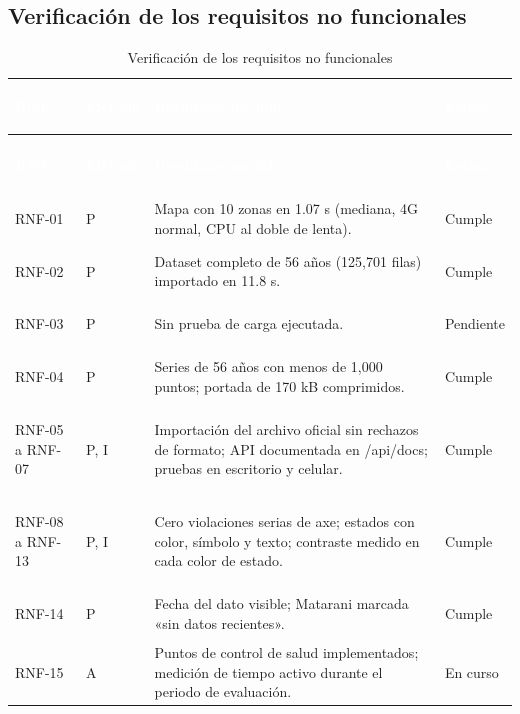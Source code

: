 \documentclass[11pt,a4paper,oneside]{article}
\begin{document}
\subsection{Verificación de los requisitos no funcionales}

{\footnotesize
\begin{xltabular}{\textwidth}{@{}>{\sffamily\bfseries\raggedright\arraybackslash}p{2.4cm}>{\raggedright\arraybackslash}p{1.3cm}Y>{\raggedright\arraybackslash}p{1.8cm}@{}}
\caption{Verificación de los requisitos no funcionales}\label{tab:verrnf}\\
\textcolor{white}{\sffamily\bfseries\footnotesize RNF} & \textcolor{white}{\sffamily\bfseries\footnotesize Método} & \textcolor{white}{\sffamily\bfseries\footnotesize Resultado medido} & \textcolor{white}{\sffamily\bfseries\footnotesize Estado}\\
\endfirsthead
{}\\
\textcolor{white}{\sffamily\bfseries\footnotesize RNF} & \textcolor{white}{\sffamily\bfseries\footnotesize Método} & \textcolor{white}{\sffamily\bfseries\footnotesize Resultado medido} & \textcolor{white}{\sffamily\bfseries\footnotesize Estado}\\
\endhead
RNF-01 & P & Mapa con 10 zonas en 1.07 s (mediana, 4G normal, CPU al doble de lenta). & Cumple\\ \hline
{}RNF-02 & P & Dataset completo de 56 años (125,701 filas) importado en 11.8 s. & Cumple\\ \hline
RNF-03 & P & Sin prueba de carga ejecutada. & Pendiente\\ \hline
{}RNF-04 & P & Series de 56 años con menos de 1,000 puntos; portada de 170 kB comprimidos. & Cumple\\ \hline
RNF-05 a RNF-07 & P, I & Importación del archivo oficial sin rechazos de formato; API documentada en /api/docs; pruebas en escritorio y celular. & Cumple\\ \hline
{}RNF-08 a RNF-13 & P, I & Cero violaciones serias de axe; estados con color, símbolo y texto; contraste medido en cada color de estado. & Cumple\\ \hline
RNF-14 & P & Fecha del dato visible; Matarani marcada «sin datos recientes». & Cumple\\ \hline
{}RNF-15 & A & Puntos de control de salud implementados; medición de tiempo activo durante el periodo de evaluación. & En curso\\ \hline

\end{xltabular}}
\end{document}

